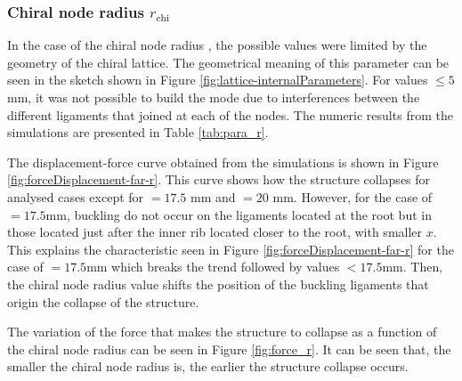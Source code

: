     \clearpage
    \subsubsection{Chiral node radius $r_{\mathrm{chi}}$}

      In the case of the chiral node radius \chir, the possible values were limited by the geometry of the chiral lattice. The geometrical meaning of this parameter can be seen in the sketch shown in Figure \ref{fig:lattice-internalParameters}. For values \chir$\le 5$ mm, it was not possible to build the mode due to interferences between the different ligaments that joined at each of the nodes. The numeric results from the simulations are presented in Table \ref{tab:para_r}.

      The displacement-force curve obtained from the simulations is shown in Figure \ref{fig:forceDisplacement-far-r}. This curve shows how the structure collapses for analysed cases except for \chir$ = 17.5$ mm and \chir$ = 20$ mm. However, for the case of \chir$= 17.5$mm, buckling do not occur on the ligaments located at the root but in those located just after the inner rib located closer to the root, with smaller $x$. This explains the characteristic seen in Figure \ref{fig:forceDisplacement-far-r} for the case of \chir$= 17.5$mm which breaks the trend followed by values \chir$< 17.5$mm. Then, the chiral node radius \chir value shifts the position of the buckling ligaments that origin the collapse of the structure.

      The variation of the force that makes the structure to collapse as a function of the chiral node radius \chir can be seen in Figure \ref{fig:force_r}. It can be seen that, the smaller the chiral node radius \chir is, the earlier the structure collapse occurs. 

